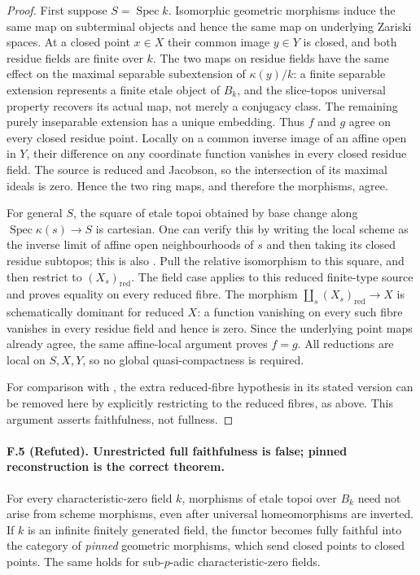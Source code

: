 \begin{proof}
First suppose $S=\operatorname{Spec}k$. Isomorphic geometric morphisms
induce the same map on subterminal objects and hence the same map on
underlying Zariski spaces. At a closed point $x\in X$ their common image
$y\in Y$ is closed, and both residue fields are finite over $k$. The two
maps on residue fields have the same effect on the maximal separable
subextension of $\kappa(y)/k$: a finite separable extension represents a
finite etale object of $B_k$, and the slice-topos universal property
recovers its actual map, not merely a conjugacy class. The remaining
purely inseparable extension has a unique embedding. Thus $f$ and $g$
agree on every closed residue point. Locally on a common inverse image of
an affine open in $Y$, their difference on any coordinate function vanishes
in every closed residue field. The source is reduced and Jacobson, so the
intersection of its maximal ideals is zero. Hence the two ring maps, and
therefore the morphisms, agree.

For general $S$, the square of etale topoi obtained by base change along
$\operatorname{Spec}\kappa(s)\to S$ is cartesian. One can verify this by
writing the local scheme as the inverse limit of affine open
neighbourhoods of $s$ and then taking its closed residue subtopos; this is
also \cite[Lemma~2.9]{CHW2024}. Pull the relative isomorphism to this square,
and then restrict to $(X_s)_{\mathrm{red}}$. The field case applies to this
reduced finite-type source and proves equality on every reduced fibre.
The morphism
$\coprod_s(X_s)_{\mathrm{red}}\to X$ is schematically dominant for reduced
$X$: a function vanishing on every such fibre vanishes in every residue
field and hence is zero. Since the underlying point maps already agree,
the same affine-local argument proves $f=g$. All reductions are local on
$S,X,Y$, so no global quasi-compactness is required.

For comparison with \cite[Theorem~3.9]{CHW2024}, the extra reduced-fibre
hypothesis in its stated version can be removed here by explicitly
restricting to the reduced fibres, as above. This argument asserts
faithfulness, not fullness.
\end{proof}

\paragraph{F.5 (Refuted). Unrestricted
full faithfulness is false; pinned reconstruction is the correct theorem.}
For every characteristic-zero field $k$, morphisms of etale topoi over
$B_k$ need not arise from scheme morphisms, even after universal
homeomorphisms are inverted. If $k$ is an infinite finitely generated
field, the functor becomes fully faithful into the category of
\emph{pinned} geometric morphisms, which send closed points to closed
points. The same holds for sub-$p$-adic characteristic-zero fields.

